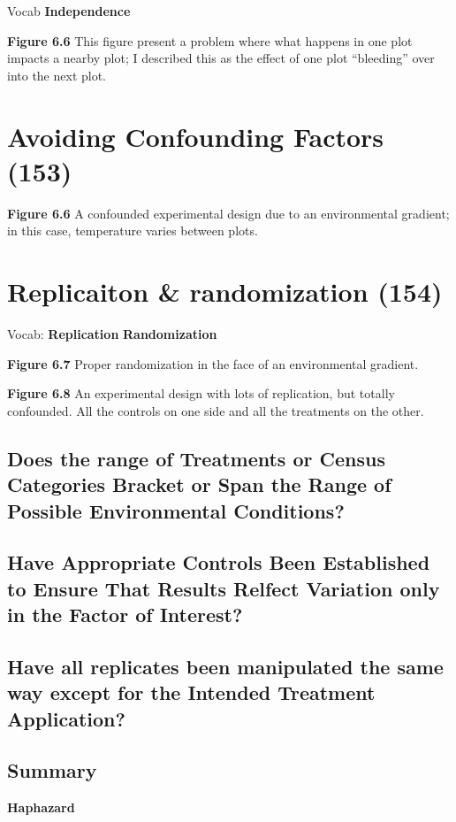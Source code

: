 \documentclass[]{book}
\theoremstyle{definition}
\theoremstyle{definition}
\theoremstyle{definition}
\theoremstyle{remark}
\begin{document}
Vocab \textbf{Independence}

\textbf{Figure 6.6} This figure present a problem where what happens in
one plot impacts a nearby plot; I described this as the effect of one
plot ``bleeding'' over into the next plot.

\section{Avoiding Confounding Factors
(153)}\label{avoiding-confounding-factors-153}

\textbf{Figure 6.6} A confounded experimental design due to an
environmental gradient; in this case, temperature varies between plots.

\section{Replicaiton \& randomization
(154)}\label{replicaiton-randomization-154}

Vocab: \textbf{Replication} \textbf{Randomization}

\textbf{Figure 6.7} Proper randomization in the face of an environmental
gradient.

\textbf{Figure 6.8} An experimental design with lots of replication, but
totally confounded. All the controls on one side and all the treatments
on the other.

\subsection{Does the range of Treatments or Census Categories Bracket or
Span the Range of Possible Environmental
Conditions?}\label{does-the-range-of-treatments-or-census-categories-bracket-or-span-the-range-of-possible-environmental-conditions}

\subsection{Have Appropriate Controls Been Established to Ensure That
Results Relfect Variation only in the Factor of
Interest?}\label{have-appropriate-controls-been-established-to-ensure-that-results-relfect-variation-only-in-the-factor-of-interest}

\subsection{Have all replicates been manipulated the same way except for
the Intended Treatment
Application?}\label{have-all-replicates-been-manipulated-the-same-way-except-for-the-intended-treatment-application}

\subsection{Summary}\label{summary-8}

\textbf{Haphazard}
\end{document}
